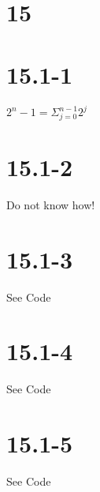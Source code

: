 \documentclass[]{article}
\title{}
\author{}
\begin{document}
\maketitle

\begin{abstract}

\end{abstract}

\section{15}

\section{15.1-1}
$2^n -1 = \Sigma_{j = 0}^{n-1} 2^j $
\section{15.1-2}
Do not know how!

\section{15.1-3}
See Code

\section{15.1-4}
See Code

\section{15.1-5}
See Code
\end{document}
